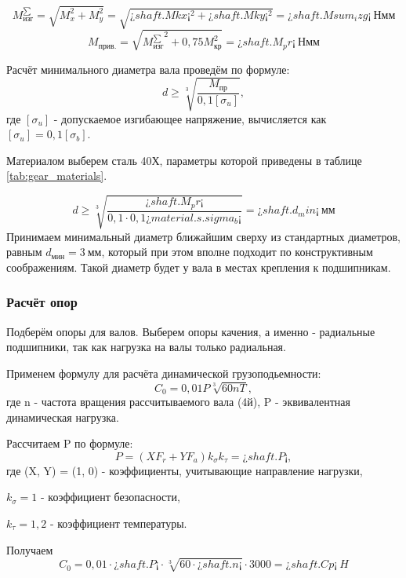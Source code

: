 \documentclass[14pt,a4paper,russian]{scrartcl}
\begin{document}
        \[ M^{\sum}_\text{изг} = \sqrt{M_x^2 + M_y^2} = \sqrt{¿shaft.Mkx¡^2 + ¿shaft.Mky¡^2} = ¿shaft.Msum_izg¡\ \text{Нмм}\]
        \[ M_\text{прив.} = \sqrt{{M^{\sum}_\text{изг}}^2 + 0,75M_\text{кр}^2} = ¿shaft.M_pr¡\ \text{Нмм}\]

        Расчёт минимального диаметра вала проведём по формуле:
        \[ d\geq \sqrt[3]{\frac{M_\text{пр}}{0,1[\sigma_u]}}, \]
        где \( [\sigma_u] \) - допускаемое изгибающее напряжение, вычисляется как
         \( [\sigma_u] = 0,1[\sigma_b] \).\par
        Материалом выберем сталь 40Х, параметры которой приведены в таблице \ref{tab:gear_materials}.\par

        \[ d\geq \sqrt[3]{\frac{¿shaft.M_pr¡}{0,1\cdot 0,1 ¿material.s.sigma_b¡}} = ¿shaft.d_min¡\ \text{мм} \]
        Принимаем минимальный диаметр ближайшим сверху из стандартных диаметров, равным
        \( d_{\text{мин}} = 3\ \text{мм} \), который при этом вполне подходит по конструктивным
        соображениям. Такой диаметр будет у вала в местах крепления к подшипникам.

    \subsubsection{Расчёт опор}
        Подберём опоры для валов. Выберем опоры качения, а именно - радиальные подшипники,
        так как нагрузка на валы только радиальная.\par
        Применем формулу для расчёта динамической грузоподьемности:
        \[ C_0 = 0,01P\sqrt[3]{60nT}, \]
        где n - частота вращения рассчитываемого вала (4й), P - эквивалентная
        динамическая нагрузка.\par
        Рассчитаем P по формуле:
        \[ P = (XF_r + YF_a)k_\sigma k_\tau = ¿shaft.P¡, \]
        где (X, Y) = (1, 0) - коэффициенты, учитывающие направление нагрузки,\par
            \( k_\sigma = 1 \) - коэффициент безопасности,\par
            \( k_\tau=1,2 \) - коэффициент температуры.\par
        Получаем
        \[ C_0 = 0,01\cdot ¿shaft.P¡ \cdot \sqrt[3]{60\cdot ¿shaft.n¡}\cdot 3000 = ¿shaft.Cp¡\ H \]
\end{document}
